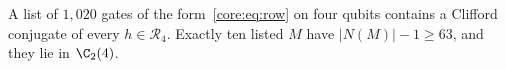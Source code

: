 A list of $1{,}020$ gates of the form~\eqref{core:eq:row} on four qubits contains a Clifford conjugate of every $h\in\mathscr R_4$. Exactly ten listed $M$ have $|N(M)|-1\ge63$, and they lie in $\C_2(4)$.
